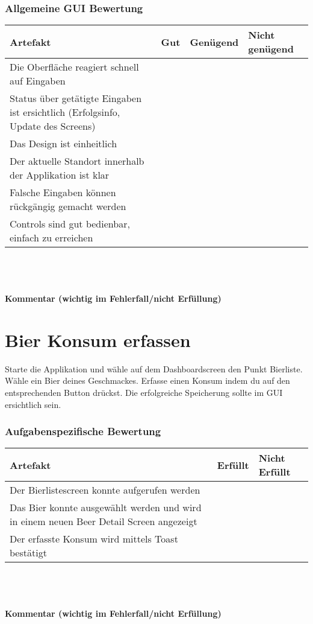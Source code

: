 \documentclass[10pt,a4paper]{scrartcl}
\begin{document}
\subsubsection*{Allgemeine GUI Bewertung}
\begin{tabular}{|p{}|p{}|p{}|p{}|}
\hline 
\rule[-1ex]{0pt}{2.5ex} \textbf{Artefakt} & \textbf{Gut} & \textbf{Genügend} & \textbf{Nicht genügend} \\ 
\hline 
\rule[-1ex]{0pt}{2.5ex} Die Oberfläche reagiert schnell auf Eingaben &  &  &  \\ 
\hline 
\rule[-1ex]{0pt}{2.5ex} Status über getätigte Eingaben ist ersichtlich (Erfolgsinfo, Update des Screens) &  &  &  \\ 
\hline 
\rule[-1ex]{0pt}{2.5ex} Das Design ist einheitlich &  &  &  \\ 
\hline 
\rule[-1ex]{0pt}{2.5ex} Der aktuelle Standort innerhalb der Applikation ist klar &  &  &  \\ 
\hline 
\rule[-1ex]{0pt}{2.5ex} Falsche Eingaben können rückgängig gemacht werden &  &  &  \\ 
\hline 
\rule[-1ex]{0pt}{2.5ex} Controls sind gut bedienbar, einfach zu erreichen &  &  &  \\  
\hline 
\end{tabular} 
\\
\\
\\
\textbf{Kommentar (wichtig im Fehlerfall/nicht Erfüllung)}
\vspace*{4cm}

\section{Bier Konsum erfassen}
Starte die Applikation und wähle auf dem Dashboardscreen den Punkt Bierliste. Wähle ein Bier deines Geschmackes. Erfasse einen Konsum indem du auf den entsprechenden Button drückst. Die erfolgreiche Speicherung sollte im GUI ersichtlich sein.

\subsubsection*{Aufgabenspezifische Bewertung}
\begin{tabular}{|p{}|p{}|p{}|}
\hline 
\textbf{Artefakt} & \textbf{Erfüllt} & \textbf{Nicht Erfüllt} \\ 
\hline 
Der Bierlistescreen konnte aufgerufen werden &  &  \\ 
\hline 
Das Bier konnte ausgewählt werden und wird in einem neuen Beer Detail Screen angezeigt &  &  \\ 
\hline 
Der erfasste Konsum wird mittels Toast bestätigt &  &  \\ 
\hline 
\end{tabular}
\\
\\
\\
\textbf{Kommentar (wichtig im Fehlerfall/nicht Erfüllung)}
\vspace*{4cm}
\end{document}
